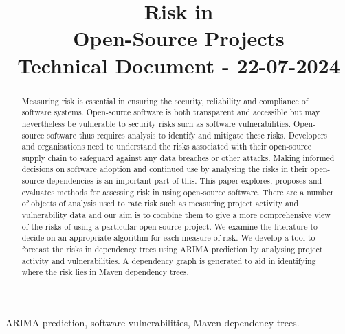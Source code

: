 \documentclass[conference]{IEEEtran}
\begin{document}
\title{Risk in \\Open-Source Projects\\
{\footnotesize Technical Document - 22-07-2024}
}

\author{
\and
{}
    }

\maketitle
\thispagestyle{plain}
\pagestyle{plain}

\begin{abstract}
Measuring risk is essential in ensuring the security, reliability and compliance of software systems. Open-source software is both transparent and accessible but may nevertheless be vulnerable to security risks such as software vulnerabilities. Open-source software thus requires analysis to identify and mitigate these risks. Developers and organisations need to understand the risks associated with their open-source supply chain to safeguard against any data breaches or other attacks. Making informed decisions on software adoption and continued use by analysing the risks in their open-source dependencies is an important part of this. This paper explores, proposes and evaluates methods for assessing risk in using open-source software. There are a number of objects of analysis used to rate risk such as measuring project activity and vulnerability data and our aim is to combine them to give a more comprehensive view of the risks of using a particular open-source project. We examine the literature to decide on an appropriate algorithm for each measure of risk. We develop a tool to forecast the risks in dependency trees using ARIMA prediction by analysing project activity and vulnerabilities. A dependency graph is generated to aid in identifying where the risk lies in Maven dependency trees. 
\end{abstract}

\begin{IEEEkeywords}
ARIMA prediction, software vulnerabilities, Maven dependency trees.
\end{IEEEkeywords}
\end{document}

